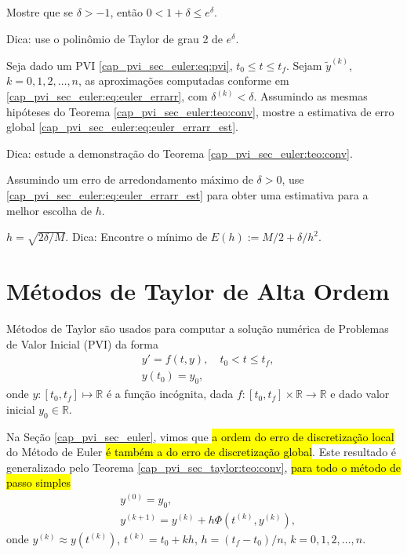 \begin{exer}
  Mostre que se $\delta>-1$, então $0 < 1+\delta \leq e^{\delta}$.
\end{exer}
\begin{resp}
  Dica: use o polinômio de Taylor de grau 2 de $e^\delta$.
\end{resp}

\begin{exer}
  Seja dado um PVI \eqref{cap_pvi_sec_euler:eq:pvi}, $t_0\leq t \leq t_f$. Sejam $\tilde{y}^{(k)}$, $k=0, 1, 2, \dotsc, n$, as aproximações computadas conforme em \eqref{cap_pvi_sec_euler:eq:euler_errarr}, com $\delta^{(k)} < \delta$. Assumindo as mesmas hipóteses do Teorema \ref{cap_pvi_sec_euler:teo:conv}, mostre a estimativa de erro global \eqref{cap_pvi_sec_euler:eq:euler_errarr_est}.
\end{exer}
\begin{resp}
  Dica: estude a demonstração do Teorema \ref{cap_pvi_sec_euler:teo:conv}.
\end{resp}

\begin{exer}
  Assumindo um erro de arredondamento máximo de $\delta > 0$, use \eqref{cap_pvi_sec_euler:eq:euler_errarr_est} para obter uma estimativa para a melhor escolha de $h$.
\end{exer}
\begin{resp}
  $h = \sqrt{2\delta/M}$. Dica: Encontre o mínimo de $E(h) := M/2 + \delta/h^2$.
\end{resp}

\section{Métodos de Taylor de Alta Ordem}\label{cap_pvi_sec_taylor}

Métodos de Taylor{\taylor} são usados para computar a solução numérica de Problemas de Valor Inicial (PVI) da forma
\begin{subequations}\label{cap_pvi_sec_taylor:eq:pvi}
  \begin{align}
    &y' = f(t, y),\quad t_0 < t \leq t_f,\\
    &y(t_0) = y_0,
  \end{align}
\end{subequations}
onde $y:[t_0, t_f]\mapsto \mathbb{R}$ é a função incógnita, dada $f:[t_0, t_f]\times\mathbb{R}\to\mathbb{R}$ e dado valor inicial $y_0\in\mathbb{R}$.

Na Seção \ref{cap_pvi_sec_euler}, vimos que \hl{a ordem do erro de discretização local} do Método de Euler{\euler} \hl{é também a do erro de discretização global}. Este resultado é generalizado pelo Teorema \ref{cap_pvi_sec_taylor:teo:conv}, \hl{para todo o método de passo simples}
\begin{subequations}\label{cap_pvi_sec_taylor:eq:iterps}
  \begin{align}
    &y^{(0)} = y_0,\\
    &y^{(k+1)} = y^{(k)} + h\Phi\left(t^{(k)}, y^{(k)}\right),
  \end{align}
\end{subequations}
onde $y^{(k)}\approx y\left(t^{(k)}\right)$, $t^{(k)} = t_0 + kh$, $h = (t_f-t_0)/n$, $k = 0, 1, 2, \dotsc, n$.

